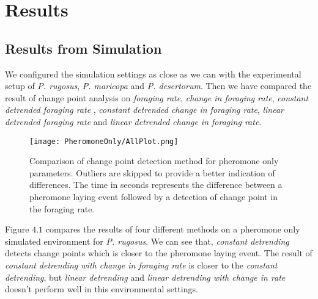 \chapter{Results}
\section{\label{section:Results from Simulation}Results from Simulation}
We configured the simulation settings as close as we can with the experimental setup of \textit{P. rugosus}, \textit{P. maricopa} and \textit{P. desertorum}. Then we have compared the result of change point analysis on \textit{foraging rate}, \textit{change in foraging rate}, \textit{constant detrended foraging rate }, \textit{constant detrended change in foraging rate}, \textit{linear detrended foraging rate} and \textit{linear detrended change in foraging rate}.\par
\begin{figure}[]
	\texttt{[image: PheromoneOnly/AllPlot.png]}
	\caption{Comparison of change point detection method for pheromone only parameters. Outliers are skipped to provide a better indication of differences. The time in seconds represents the difference between a pheromone laying event followed by a detection of change point in the foraging rate.}
\end{figure} 
Figure $4.1$ compares the results of four different methods on a pheromone only simulated environment for \textit{P. rugosus}. We can see that, \textit{constant detrending} detects change points which is closer to the pheromone laying event. The result of \textit{constant detrending with change in foraging rate} is closer to the \textit{constant detrending}, but \textit{linear detrending} and \textit{linear detrending with change in rate} doesn't perform well in this environmental settings.\par 

